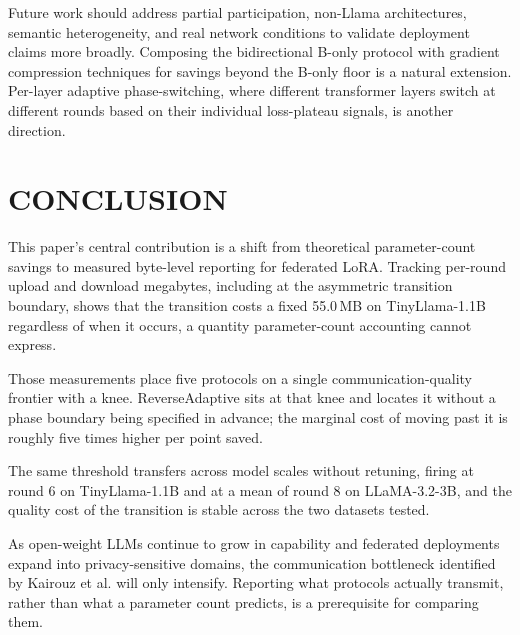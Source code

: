 Future work should address partial participation, non-Llama architectures, semantic heterogeneity, and real network conditions to validate deployment claims more broadly. Composing the bidirectional B-only protocol with gradient compression techniques \cite{alistarh2017qsgd,lin2017deep} for savings beyond the B-only floor is a natural extension. Per-layer adaptive phase-switching, where different transformer layers switch at different rounds based on their individual loss-plateau signals, is another direction.

\section{CONCLUSION}
\label{sec:conclusion}

This paper's central contribution is a shift from theoretical parameter-count savings to measured byte-level reporting for federated LoRA. Tracking per-round upload and download megabytes, including at the asymmetric transition boundary, shows that the transition costs a fixed 55.0\,MB on TinyLlama-1.1B regardless of when it occurs, a quantity parameter-count accounting cannot express.

Those measurements place five protocols on a single communication-quality frontier with a knee. ReverseAdaptive sits at that knee and locates it without a phase boundary being specified in advance; the marginal cost of moving past it is roughly five times higher per point saved.

The same threshold transfers across model scales without retuning, firing at round 6 on TinyLlama-1.1B and at a mean of round 8 on LLaMA-3.2-3B, and the quality cost of the transition is stable across the two datasets tested.

As open-weight LLMs continue to grow in capability and federated deployments expand into privacy-sensitive domains, the communication bottleneck identified by Kairouz et al. \cite{kairouz2021advances} will only intensify. Reporting what protocols actually transmit, rather than what a parameter count predicts, is a prerequisite for comparing them.
